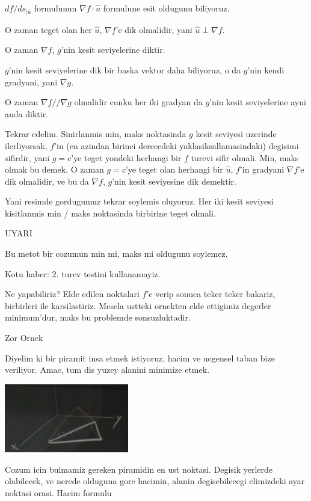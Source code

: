 \documentclass[12pt,fleqn]{article}\usepackage{../common}
\begin{document}
$df / ds_{|\hat{u}}$ formulunun $\nabla f \cdot \hat{u}$ formulune esit oldugunu  biliyoruz. 

O zaman teget olan her $\hat{u}$, $\nabla f$'e dik olmalidir, yani $\hat{u} \perp \nabla f$. 

O zaman $\nabla f$, $g$'nin kesit seviyelerine diktir. 

$g$'nin kesit seviyelerine dik bir baska vektor daha biliyoruz, o 
da $g$'nin kendi gradyani, yani $\nabla g$. 

O zaman $\nabla f // \nabla g$ olmalidir cunku her iki gradyan da $g$'nin
kesit seviyelerine ayni anda diktir. 

Tekrar edelim. Sinirlanmis min, maks noktasinda $g$ kesit seviyesi uzerinde
ilerliyorsak, $f$'in (en azindan birinci derecedeki yaklasiksallamasindaki)
degisimi sifirdir, yani $g=c$'ye teget yondeki herhangi bir $f$ turevi sifir
olmali. Min, maks olmak bu demek. O zaman $g=c$'ye teget olan herhangi bir
$\hat{u}$, $f$'in gradyani $\nabla f$'e dik olmalidir, ve bu da $\nabla f$,
$g$'nin kesit seviyesine dik demektir. 

Yani resimde gordugumuz tekrar soylemis oluyoruz. Her iki kesit seviyesi
kisitlanmis min / maks noktasinda birbirine teget olmali.

UYARI

Bu metot bir cozumun min mi, maks mi oldugunu soylemez. 

Kotu haber: 2. turev testini kullanamayiz. 

Ne yapabiliriz? Elde edilen noktalari $f$'e verip sonuca teker teker
bakariz, birbirleri ile karsilastiriz. Mesela ustteki ornekten elde
ettigimiz degerler minimum'dur, maks bu problemde sonsuzluktadir.

Zor Ornek

Diyelim ki bir piramit insa etmek istiyoruz, hacim ve ucgensel taban bize
veriliyor. Amac, tum dis yuzey alanini minimize etmek. 

\includegraphics[height=3cm]{13_8.png}

Cozum icin bulmamiz gereken piramidin en ust noktasi. Degisik yerlerde
olabilecek, ve nerede olduguna gore hacimin, alanin degisebilecegi
elimizdeki ayar noktasi orasi. Hacim formulu
\end{document}
